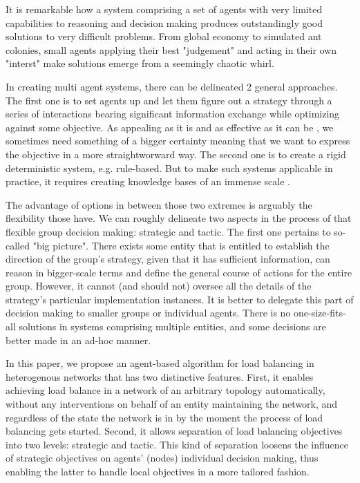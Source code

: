 It is remarkable how a system comprising a set of agents with very limited capabilities to reasoning and decision making produces outstandingly good solutions to very difficult problems.
From global economy to simulated ant colonies, small agents applying their best "judgement" and acting in their own "interst" make solutions emerge from a seemingly chaotic whirl.

In creating multi agent systems, there can be delineated 2 general approaches.
The first one is to set agents up and let them figure out a strategy through a series of interactions bearing significant information exchange while optimizing against some objective.
As appealing as it is and as effective as it can be \cite{dorigo-2006}, we sometimes need something of a bigger certainty meaning that we want to express the objective in a more straightworward way.
The second one is to create a rigid deterministic system, e.g. rule-based.
But to make such systems applicable in practice, it requires creating knowledge bases of an immense scale \cite{lenat-2022}.

The advantage of options in between those two extremes is arguably the flexibility those have.
We can roughly delineate two aspects in the process of that flexible group decision making: strategic and tactic.
The first one pertains to so-called "big picture".
There exists some entity that is entitled to establish the direction of the group's strategy, given that it has sufficient information, can reason in bigger-scale terms and define the general course of actions for the entire group.
However, it cannot (and should not) oversee all the details of the strategy's particular implementation instances.
It is better to delegate this part of decision making to smaller groups or individual agents.
There is no one-size-fits-all solutions in systems comprising multiple entities, and some decisions are better made in an ad-hoc manner.

In this paper, we propose an agent-based algorithm for load balancing in heterogenous networks that has two distinctive features.
First, it enables achieving load balance in a network of an arbitrary topology automatically, without any interventions on behalf of an entity maintaining the network, and regardless of the state the network is in by the moment the process of load balancing gets started.
Second, it allows separation of load balancing objectives into two levels: strategic and tactic.
This kind of separation loosens the influence of strategic objectives on  agents' (nodes) individual decision making, thus enabling the latter to handle local objectives in a more tailored fashion.


